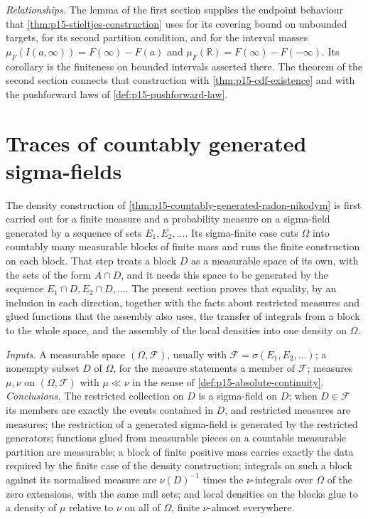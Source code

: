\emph{Relationships.} The lemma of the first section supplies the endpoint
behaviour that \cref{thm:p15-stieltjes-construction} uses for its covering
bound on unbounded targets, for its second partition condition, and for the
interval masses \(\mu_F(I(a,\infty))=F(\infty)-F(a)\) and
\(\mu_F(\mathbb R)=F(\infty)-F(-\infty)\). Its corollary is the finiteness
on bounded intervals asserted there. The theorem of the second section
connects that construction with \cref{thm:p15-cdf-existence} and with the
pushforward laws of \cref{def:p15-pushforward-law}.

\section{Traces of countably generated sigma-fields}
\label{sec:p15-w02c-p15-003-trace-sigma-fields}

The density construction of \cref{thm:p15-countably-generated-radon-nikodym}
is first carried out for a finite measure and a probability measure on a
sigma-field generated by a sequence of sets \(E_1,E_2,\ldots\). Its
sigma-finite case cuts \(\Omega\) into countably many measurable blocks of
finite mass and runs the finite construction on each block. That step treats
a block \(D\) as a measurable space of its own, with the sets of the form
\(A\cap D\), and it needs this space to be generated by the sequence
\(E_1\cap D,E_2\cap D,\ldots\). The present section proves that equality,
by an inclusion in each direction, together with the facts about restricted
measures and glued functions that the assembly also uses, the transfer of
integrals from a block to the whole space, and the assembly of the local
densities into one density on \(\Omega\).

\emph{Inputs.} A measurable space \((\Omega,\mathcal F)\), usually with
\(\mathcal F=\sigma(E_1,E_2,\ldots)\); a nonempty subset \(D\) of
\(\Omega\), for the measure statements a member of \(\mathcal F\); measures
\(\mu,\nu\) on \((\Omega,\mathcal F)\) with \(\mu\ll\nu\) in the sense of
\cref{def:p15-absolute-continuity}. \emph{Conclusions.} The restricted
collection on \(D\) is a sigma-field on \(D\); when \(D\in\mathcal F\) its
members are exactly the events contained in \(D\), and restricted measures
are measures; the restriction of a generated sigma-field is generated by the
restricted generators; functions glued from measurable pieces on a countable
measurable partition are measurable; a block of finite positive mass
carries exactly the data required by the finite case of the density
construction; integrals on such a block against its normalised measure are
\(\nu(D)^{-1}\) times the \(\nu\)-integrals over \(\Omega\) of the zero
extensions, with the same null sets; and local densities on the blocks glue
to a density of \(\mu\) relative to \(\nu\) on all of \(\Omega\),
finite \(\nu\)-almost everywhere.

